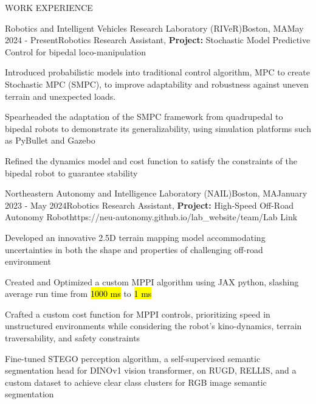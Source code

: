 \documentclass{resume} %
\begin{document}
\begin{rSection}{WORK EXPERIENCE}
	\begin{rProjExpDetails}{Robotics and Intelligent Vehicles Research Laboratory (RIVeR)}{Boston, MA}{May 2024 - Present}{Robotics Research Assistant, \textbf{Project:} Stochastic Model Predictive Control for bipedal loco-manipulation}{}{}
		\item Introduced probabilistic models into traditional control algorithm, MPC to create Stochastic MPC (SMPC), to improve adaptability and robustness against uneven terrain and unexpected loads.
		\item Spearheaded the adaptation of the SMPC framework from quadrupedal to bipedal robots to demonstrate its generalizability, using simulation platforms such as PyBullet and Gazebo
		\item Refined the dynamics model and cost function to satisfy the constraints of the bipedal robot to guarantee stability %
	\end{rProjExpDetails}
	\begin{rProjExpDetails}{Northeastern Autonomy and Intelligence Laboratory (NAIL)}{Boston, MA}{January 2023 - May 2024}{Robotics Research Assistant, \textbf{Project:} High-Speed Off-Road Autonomy Robot}{https://neu-autonomy.github.io/lab_website/team/}{Lab Link}
		\item Developed an innovative 2.5D terrain mapping model accommodating uncertainties in both the shape and properties of challenging off-road environment
		\item Created and Optimized a custom MPPI algorithm using JAX python, slashing average run time from \hl{1000 ms} to \hl{1 ms}
		\item Crafted a custom cost function for MPPI controls, prioritizing speed in unstructured environments while considering the robot's kino-dynamics, terrain traversability, and safety constraints
		\item Fine-tuned STEGO perception algorithm, a self-supervised semantic segmentation head for DINOv1 vision transformer, on RUGD, RELLIS, and a custom dataset to achieve clear class clusters for RGB image semantic segmentation

\end{rProjExpDetails}
\end{rSection}
\end{document}
